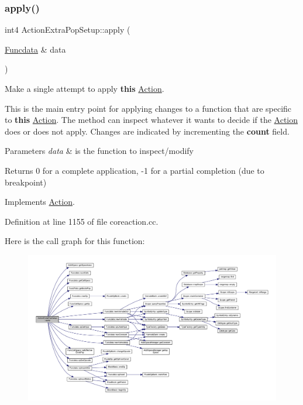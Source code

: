 \subsubsection{\texorpdfstring{apply()}{apply()}}
{\footnotesize\ttfamily int4 Action\+Extra\+Pop\+Setup\+::apply (\begin{DoxyParamCaption}\item[{\mbox{\hyperlink{class_funcdata}{Funcdata}} \&}]{data }\end{DoxyParamCaption})\hspace{0.3cm}{\ttfamily [virtual]}}



Make a single attempt to apply {\bfseries{this}} \mbox{\hyperlink{class_action}{Action}}. 

This is the main entry point for applying changes to a function that are specific to {\bfseries{this}} \mbox{\hyperlink{class_action}{Action}}. The method can inspect whatever it wants to decide if the \mbox{\hyperlink{class_action}{Action}} does or does not apply. Changes are indicated by incrementing the {\bfseries{count}} field. 
\begin{DoxyParams}{Parameters}
{\em data} & is the function to inspect/modify \\
\hline
\end{DoxyParams}
\begin{DoxyReturn}{Returns}
0 for a complete application, -\/1 for a partial completion (due to breakpoint) 
\end{DoxyReturn}


Implements \mbox{\hyperlink{class_action_aac1c3999d6c685b15f5d9765a4d04173}{Action}}.



Definition at line 1155 of file coreaction.\+cc.

Here is the call graph for this function\+:
\nopagebreak
\begin{figure}[H]
\begin{center}
\leavevmode
\includegraphics[width=350pt]{class_action_extra_pop_setup_a1518c4ca7772ccb59b6cde0857cf657c_cgraph}
\end{center}
\end{figure}
\mbox{\label{class_action_extra_pop_setup_aa4e0ef3d72672cf8fad9dea555a99cb8}} 
